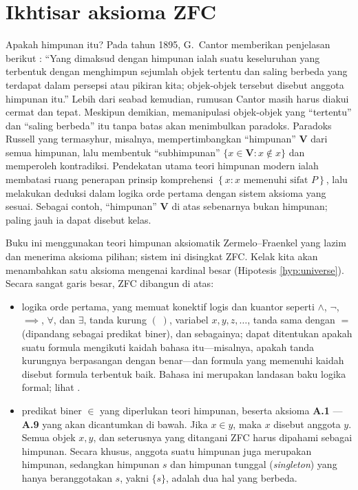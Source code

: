 \section{Ikhtisar aksioma ZFC}\label{sec:ZFC}
Apakah himpunan itu? Pada tahun 1895, G.\ Cantor memberikan penjelasan berikut \cite[p.481]{Cantor95}: ``Yang dimaksud dengan himpunan ialah suatu keseluruhan yang terbentuk dengan menghimpun sejumlah objek tertentu dan saling berbeda yang terdapat dalam persepsi atau pikiran kita; objek-objek tersebut disebut anggota himpunan itu.'' Lebih dari seabad kemudian, rumusan Cantor masih harus diakui cermat dan tepat. Meskipun demikian, memanipulasi objek-objek yang ``tertentu'' dan ``saling berbeda'' itu tanpa batas akan menimbulkan paradoks. Paradoks Russell yang termasyhur, misalnya, mempertimbangkan ``himpunan'' $\textbf{V}$ dari semua himpunan, lalu membentuk ``subhimpunan'' $\{x \in \textbf{V} : x \notin x\}$ dan memperoleh kontradiksi. Pendekatan utama teori himpunan modern ialah membatasi ruang penerapan prinsip komprehensi $\left\{x : x \text{ memenuhi sifat } P\right \}$, lalu melakukan deduksi dalam logika orde pertama dengan sistem aksioma yang sesuai. Sebagai contoh, ``himpunan'' $\textbf{V}$ di atas sebenarnya bukan himpunan; paling jauh ia dapat disebut kelas.

Buku ini menggunakan teori himpunan aksiomatik Zermelo--Fraenkel yang lazim dan menerima aksioma pilihan; sistem ini disingkat ZFC. Kelak kita akan menambahkan satu aksioma mengenai kardinal besar (Hipotesis \ref{hyp:universe}). Secara sangat garis besar, ZFC dibangun di atas:
\begin{itemize}
	\item logika orde pertama, yang memuat konektif logis dan kuantor seperti $\wedge$, $\neg$, $\implies$, $\forall$, dan $\exists$, tanda kurung $(\;)$, variabel $x, y, z, \ldots$, tanda sama dengan $=$ (dipandang sebagai predikat biner), dan sebagainya; dapat ditentukan apakah suatu formula mengikuti kaidah bahasa itu---misalnya, apakah tanda kurungnya berpasangan dengan benar---dan formula yang memenuhi kaidah disebut formula terbentuk baik. Bahasa ini merupakan landasan baku logika formal; lihat \cite[Bab 2]{Feng17}.
	\item predikat biner $\in$ yang diperlukan teori himpunan, beserta aksioma \textbf{A.1} --- \textbf{A.9} yang akan dicantumkan di bawah. Jika $x \in y$, maka $x$ disebut anggota $y$. Semua objek $x,y$, dan seterusnya yang ditangani ZFC harus dipahami sebagai himpunan. Secara khusus, anggota suatu himpunan juga merupakan himpunan, sedangkan himpunan $s$ dan himpunan tunggal (\emph{singleton}) yang hanya beranggotakan $s$, yakni $\{s\}$, adalah dua hal yang berbeda.
\end{itemize}


